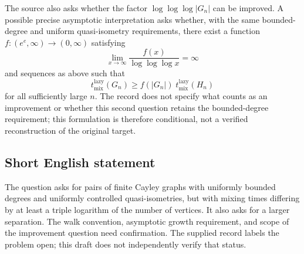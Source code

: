 \documentclass[11pt]{article}
\begin{document}
The source also asks whether the factor \(\log\log\log|G_n|\) can be improved. A possible precise asymptotic interpretation asks whether, with the same bounded-degree and uniform quasi-isometry requirements, there exist a function \(f:(e^e,\infty)\to(0,\infty)\) satisfying
\[
 \lim_{x\to\infty}\frac{f(x)}{\log\log\log x}=\infty
\]
and sequences as above such that
\[
 t_{\mathrm{mix}}^{\mathrm{lazy}}(G_n)\geq f(|G_n|)\;t_{\mathrm{mix}}^{\mathrm{lazy}}(H_n)
\]
for all sufficiently large \(n\). The record does not specify what counts as an improvement or whether this second question retains the bounded-degree requirement; this formulation is therefore conditional, not a verified reconstruction of the original target.
\subsection{Short English statement}
The question asks for pairs of finite Cayley graphs with uniformly bounded degrees and uniformly controlled quasi-isometries, but with mixing times differing by at least a triple logarithm of the number of vertices. It also asks for a larger separation. The walk convention, asymptotic growth requirement, and scope of the improvement question need confirmation. The supplied record labels the problem open; this draft does not independently verify that status.
\end{document}
